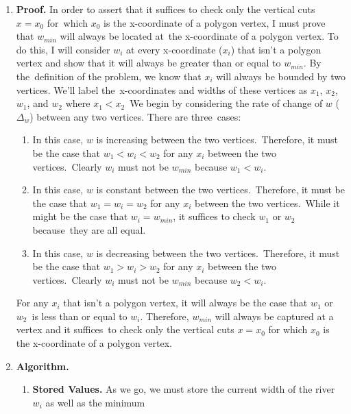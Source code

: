 \documentclass[11pt]{article}
\begin{document}
\begin{solution}
  \begin{enumerate}
    \item[1.] \textbf{Proof.} In order to assert that it suffices to check only the vertical cuts \(x = x_0\) for\
    which \(x_0\) is the x-coordinate of a polygon vertex, I must prove that \(w_{min}\) will always be located at\
    the x-coordinate of a polygon vertex. To do this, I will consider \(w_i\) at every x-coordinate (\(x_i\)) that
    isn't a polygon vertex and show that it will always be greater than or equal to \(w_{min}\). By the\
    definition of the problem, we know that \(x_i\) will always be bounded by two vertices. We'll label the\
    x-coordinates and widths of these vertices as \(x_1\), \(x_2\), \(w_1\), and \(w_2\) where \(x_1 < x_2\)\
    We begin by considering the rate of change of \(w\) (\(\Delta_w\)) between any two vertices. There are three\
    cases:
    \begin{enumerate}
      \item[\(\Delta_w > 0\)] In this case, \(w\) is increasing between the two vertices.\
        Therefore, it must be the case that \(w_1 < w_i < w_2\) for any \(x_i\) between the two vertices.\
        Clearly \(w_i\) must not be \(w_{min}\) because \(w_1 < w_i\).
      \item[\(\Delta_w = 0\)] In this case, \(w\) is constant between the two vertices.\
        Therefore, it must be the case that \(w_1 = w_i = w_2\) for any \(x_i\) between the two vertices.\
        While it might be the case that \(w_i = w_{min}\), it suffices to check \(w_1\) or \(w_2\) because\
        they are all equal.
      \item[\(\Delta_w < 0\)] In this case, \(w\) is decreasing between the two vertices.\
        Therefore, it must be the case that \(w_1 > w_i > w_2\) for any \(x_i\) between the two vertices.\
        Clearly \(w_i\) must not be \(w_{min}\) because \(w_2 < w_i\).
    \end{enumerate}
    For any \(x_i\) that isn't a polygon vertex, it will always be the case that \(w_1\) or \(w_2\)\
    is less than or equal to \(w_i\). Therefore, \(w_{min}\) will always be captured at a vertex and it suffices\
    to check only the vertical cuts \(x = x_0\) for which \(x_0\) is the x-coordinate of a polygon vertex.
    \item[2.] \textbf{Algorithm.}
      \begin{enumerate}
        \item \textbf{Stored Values.} As we go, we must store the current width of the river \(w_i\) as well as the minimum\

\end{enumerate}
\end{enumerate}
\end{solution}
\end{document}
